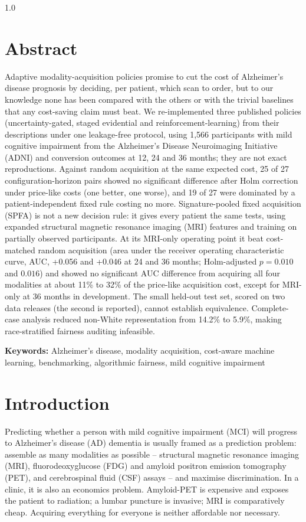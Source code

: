 \documentclass[12pt,twoside]{article}
\begin{document}
\fontsize{12}{12}\selectfont
\begin{spacing}{1.0}

\section*{Abstract}
Adaptive modality-acquisition policies promise to cut the cost of Alzheimer's disease prognosis by deciding, per patient, which scan to order, but to our knowledge none has been compared with the others or with the trivial baselines that any cost-saving claim must beat. We re-implemented three published policies (uncertainty-gated, staged evidential and reinforcement-learning) from their descriptions under one leakage-free protocol, using 1,566 participants with mild cognitive impairment from the Alzheimer's Disease Neuroimaging Initiative (ADNI) and conversion outcomes at 12, 24 and 36 months; they are not exact reproductions. Against random acquisition at the same expected cost, 25 of 27 configuration-horizon pairs showed no significant difference after Holm correction under price-like costs (one better, one worse), and 19 of 27 were dominated by a patient-independent fixed rule costing no more. Signature-pooled fixed acquisition (SPFA) is not a new decision rule: it gives every patient the same tests, using expanded structural magnetic resonance imaging (MRI) features and training on partially observed participants. At its MRI-only operating point it beat cost-matched random acquisition (area under the receiver operating characteristic curve, AUC, +0.056 and +0.046 at 24 and 36 months; Holm-adjusted $p=0.010$ and $0.016$) and showed no significant AUC difference from acquiring all four modalities at about 11\% to 32\% of the price-like acquisition cost, except for MRI-only at 36 months in development. The small held-out test set, scored on two data releases (the second is reported), cannot establish equivalence. Complete-case analysis reduced non-White representation from 14.2\% to 5.9\%, making race-stratified fairness auditing infeasible.

\vspace{5pt}
\textbf{\fontsize{12}{12}\selectfont Keywords:} Alzheimer's disease,
modality acquisition, cost-aware machine learning, benchmarking,
algorithmic fairness, mild cognitive impairment

\section{Introduction}
Predicting whether a person with mild cognitive impairment (MCI) will
progress to Alzheimer's disease (AD) dementia is usually framed as a
prediction problem: assemble as many modalities as possible -- structural
magnetic resonance imaging (MRI), fluorodeoxyglucose (FDG) and amyloid
positron emission tomography (PET), and cerebrospinal fluid (CSF) assays --
and maximise
discrimination. In a clinic, it is also an economics problem. Amyloid-PET
is expensive and exposes the patient to radiation; a lumbar puncture is
invasive; MRI is comparatively cheap. Acquiring everything for everyone is
neither affordable nor necessary.


\end{spacing}
\end{document}
